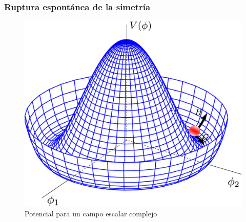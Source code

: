 \documentclass[%
xcolor=pdftex,dvipsnames,table%
]{beamer}
\begin{document}
\begin{frame}
  \frametitle{Ruptura espontánea de la simetría}
  \begin{figure}
  \centering
  \includegraphics[scale=0.5]{mexicanhat}
  \caption{Potencial para un campo escalar complejo}
  \label{fig:mexicanhat}
\end{figure}
\end{frame}
{
\begin{frame}[plain]
\end{frame}
}
\end{document}
